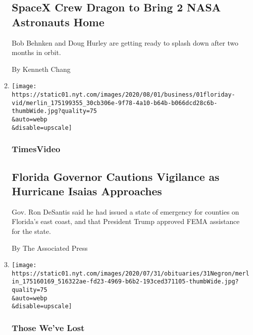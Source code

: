\begin{enumerate}
  \hypertarget{spacex-crew-dragon-to-bring-2-nasa-astronauts-home}{%
  \subsection{SpaceX Crew Dragon to Bring 2 NASA Astronauts
  Home}\label{spacex-crew-dragon-to-bring-2-nasa-astronauts-home}}

  Bob Behnken and Doug Hurley are getting ready to splash down after two
  months in orbit.

  By Kenneth Chang
\item
  \href{/video/us/100000007268424/desantis-florida-hurricane-isaias.html}{}

  \texttt{[image: https://static01.nyt.com/images/2020/08/01/business/01floriday-vid/merlin\_175199355\_30cb306e-9f78-4a10-b64b-b066dcd28c6b-thumbWide.jpg?quality=75\\\&auto=webp\\\&disable=upscale]}

  \hypertarget{timesvideo}{%
  \subsubsection{TimesVideo}\label{timesvideo}}

  \hypertarget{florida-governor-cautions-vigilance-as-hurricane-isaias-approaches}{%
  \subsection{Florida Governor Cautions Vigilance as Hurricane Isaias
  Approaches}\label{florida-governor-cautions-vigilance-as-hurricane-isaias-approaches}}

  Gov. Ron DeSantis said he had issued a state of emergency for counties
  on Florida's east coast, and that President Trump approved FEMA
  assistance for the state.

  By The Associated Press
\item
  \href{/2020/08/01/obituaries/eddie-negron-dead-coronavirus.html}{}

  \texttt{[image: https://static01.nyt.com/images/2020/07/31/obituaries/31Negron/merlin\_175160169\_516322ae-fd23-4969-b6b2-193ced371105-thumbWide.jpg?quality=75\\\&auto=webp\\\&disable=upscale]}

  \hypertarget{those-weve-lost}{%
  \subsubsection{Those We've Lost}\label{those-weve-lost}}

  \hypertarget{dr-eddie-negruxf3n-a-physician-full-of-fun-is-dead-at-69}{%
}
\end{enumerate}
